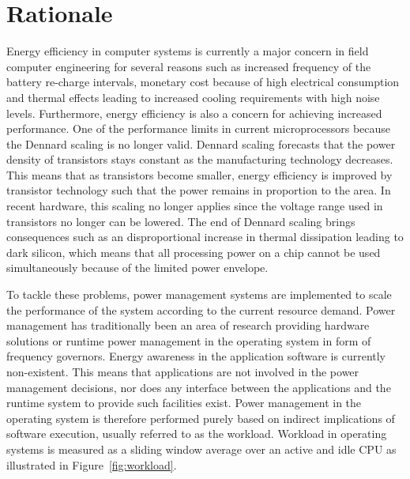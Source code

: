 \documentclass{article}
\begin{document}
\section{Rationale}
Energy efficiency in computer systems is currently a major concern in field computer engineering for several reasons such as increased frequency of the battery re-charge intervals, 
monetary cost because of high electrical consumption and thermal effects leading to increased cooling requirements with high noise levels. 
Furthermore, energy efficiency is also a concern for achieving increased performance.
One of the performance limits in current microprocessors because the Dennard scaling \cite{Dennard:74} is no longer valid. 
Dennard scaling forecasts that the power density of transistors stays constant as the manufacturing technology decreases. 
This means that as transistors become smaller, energy efficiency is improved by transistor technology such that the power remains in proportion to the area. 
In recent hardware, this scaling no longer applies since the voltage range used in transistors no longer can be lowered. 
The end of Dennard scaling brings consequences such as an disproportional increase in thermal dissipation leading to dark silicon, 
which means that all processing power on a chip cannot be used simultaneously because of the limited power envelope.

To tackle these problems, power management systems are implemented to scale the performance of the system according to the current resource demand. 
Power management has traditionally been an area of research providing hardware solutions or runtime power management in the operating system in form of frequency governors. 
Energy awareness in the application software is currently non-existent. This means that applications are not involved in the power management decisions, 
nor does any interface between the applications and the runtime system to provide such facilities exist. 
Power management in the operating system is therefore performed purely based on indirect implications of software execution, usually referred to as the workload. 
Workload in operating systems is measured as a sliding window average over an active and idle CPU as illustrated in Figure~\ref{fig:workload}. 
\end{document}
